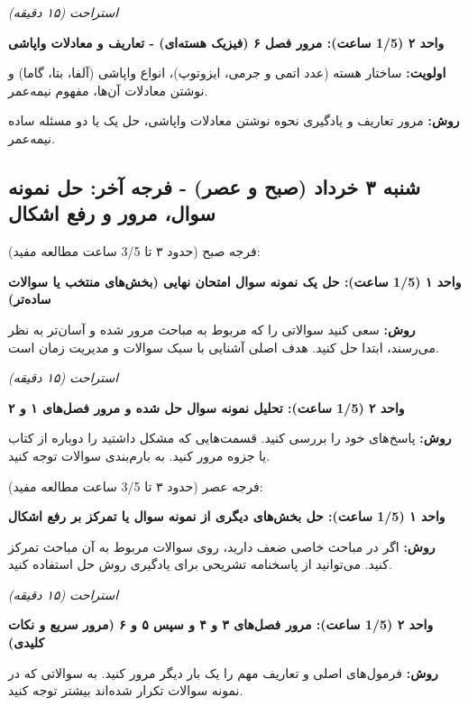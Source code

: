 \documentclass[12pt]{article}
\newcommand{\unithead}[1]{\par\vspace{1ex}\noindent\textbf{#1}\par\nopagebreak[4]\vspace{0.5ex}}
\newcommand{\休息}[1]{\par\centering\textit{#1}\par\vspace{1ex}} %
\begin{document}
\休息{استراحت (۱۵ دقیقه)}

\unithead{واحد ۲ (1/5 ساعت): مرور فصل ۶ (فیزیک هسته‌ای) - تعاریف و معادلات واپاشی}
\noindent\textbf{اولویت: }ساختار هسته (عدد اتمی و جرمی، ایزوتوپ)، انواع واپاشی (آلفا، بتا، گاما) و نوشتن معادلات آن‌ها، مفهوم نیمه‌عمر.
\par\noindent\textbf{روش: }مرور تعاریف و یادگیری نحوه نوشتن معادلات واپاشی، حل یک یا دو مسئله ساده نیمه‌عمر.

\subsection*{شنبه ۳ خرداد (صبح و عصر) - فرجه آخر: حل نمونه سوال، مرور و رفع اشکال}
فرجه صبح (حدود ۳ تا 3/5 ساعت مطالعه مفید):

\unithead{واحد ۱ (1/5 ساعت): حل یک نمونه سوال امتحان نهایی (بخش‌های منتخب یا سوالات ساده‌تر)}
\noindent\textbf{روش: }سعی کنید سوالاتی را که مربوط به مباحث مرور شده و آسان‌تر به نظر می‌رسند، ابتدا حل کنید. هدف اصلی آشنایی با سبک سوالات و مدیریت زمان است.

\休息{استراحت (۱۵ دقیقه)}

\unithead{واحد ۲ (1/5 ساعت): تحلیل نمونه سوال حل شده و مرور فصل‌های ۱ و ۲}
\noindent\textbf{روش: }پاسخ‌های خود را بررسی کنید. قسمت‌هایی که مشکل داشتید را دوباره از کتاب یا جزوه مرور کنید. به بارم‌بندی سوالات توجه کنید.

\vspace{1em}
فرجه عصر (حدود ۳ تا 3/5 ساعت مطالعه مفید):

\unithead{واحد ۱ (1/5 ساعت): حل بخش‌های دیگری از نمونه سوال یا تمرکز بر رفع اشکال}
\noindent\textbf{روش: }اگر در مباحث خاصی ضعف دارید، روی سوالات مربوط به آن مباحث تمرکز کنید. می‌توانید از پاسخنامه تشریحی برای یادگیری روش حل استفاده کنید.

\休息{استراحت (۱۵ دقیقه)}

\unithead{واحد ۲ (1/5 ساعت): مرور فصل‌های ۳ و ۴ و سپس ۵ و ۶ (مرور سریع و نکات کلیدی)}
\noindent\textbf{روش: }فرمول‌های اصلی و تعاریف مهم را یک بار دیگر مرور کنید. به سوالاتی که در نمونه سوالات تکرار شده‌اند بیشتر توجه کنید.
\end{document}
